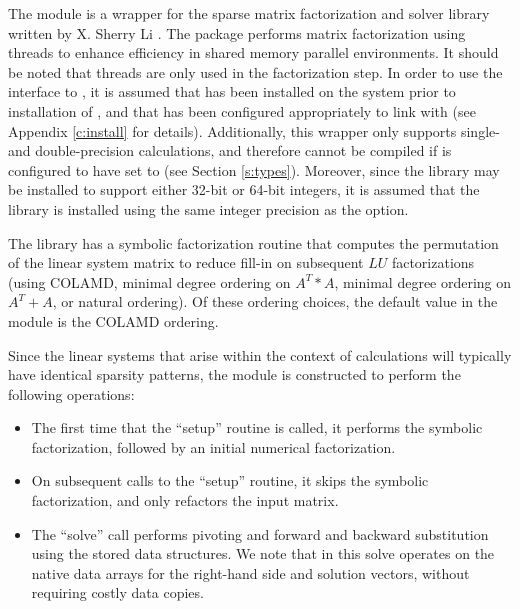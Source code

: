 {\warn} The {\sunlinsolslumt} module is a {\sunlinsol} wrapper for
the {\superlumt} sparse matrix factorization and solver library
written by X. Sherry Li \cite{SuperLUMT_site,Li:05,DGL:99}.  The
package performs matrix factorization using threads to enhance
efficiency in shared memory parallel environments.  It should be noted
that threads are only used in the factorization step.  In
order to use the {\sunlinsolslumt} interface to {\superlumt}, it is
assumed that {\superlumt} has been installed on the system prior to
installation of {\sundials}, and that {\sundials} has been configured
appropriately to link with {\superlumt} (see Appendix \ref{c:install}
for details).  Additionally, this wrapper only supports single- and
double-precision calculations, and therefore cannot be compiled if
{\sundials} is configured to have  set to 
(see Section \ref{s:types}).  Moreover, since the {\superlumt} library
may be installed to support either 32-bit or 64-bit integers, it is
assumed that the {\superlumt} library is installed using the same
integer precision as the {\sundials}  option.

The {\superlumt} library has a symbolic factorization routine that
computes the permutation of the linear system matrix to reduce fill-in
on subsequent $LU$ factorizations (using COLAMD, minimal degree
ordering on $A^T*A$, minimal degree ordering on $A^T+A$, or natural
ordering).  Of these ordering choices, the default value in the
{\sunlinsolslumt} module is the COLAMD ordering. 

Since the linear systems that arise within the context of {\sundials}
calculations will typically have identical sparsity patterns, the
{\sunlinsolslumt} module is constructed to perform the
following operations:
\begin{itemize}
\item The first time that the ``setup'' routine is called, it
  performs the symbolic factorization, followed by an initial
  numerical factorization.  
\item On subsequent calls to the ``setup'' routine, it skips the
  symbolic factorization, and only refactors the input matrix.
\item The ``solve'' call performs pivoting and forward and
  backward substitution using the stored {\superlumt} data
  structures.  We note that in this solve {\superlumt} operates on the
  native data arrays for the right-hand side and solution vectors,
  without requiring costly data copies.
\end{itemize}


